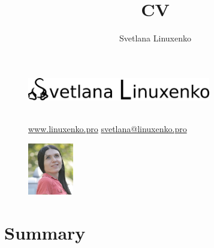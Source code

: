 \documentclass[a4paper,11pt]{article}
\author{Svetlana Linuxenko}
\title{CV}
\begin{document}
\begin{figure}
  \begin{minipage}{0.30\textwidth}
    {\includegraphics[height=28pt]{s}}
  \end{minipage}
  \begin{minipage}{0.55\textwidth}
    \flushright
    \\\bigskip\break
    {\hspace{22pt}\break
    \normalsize{
    \href{https://www.linuxenko.pro}{www.linuxenko.pro}\hspace{22pt}\break
    \href{mailto:svetlana@linuxenko.pro}{svetlana@linuxenko.pro}\hspace{22pt}\break
  }}
  \end{minipage}
  \begin{minipage}{0.10\textwidth}
    {\includegraphics[height=64pt]{pic}}
  \end{minipage}
\end{figure}


%

\section*{Summary}
\end{document}

